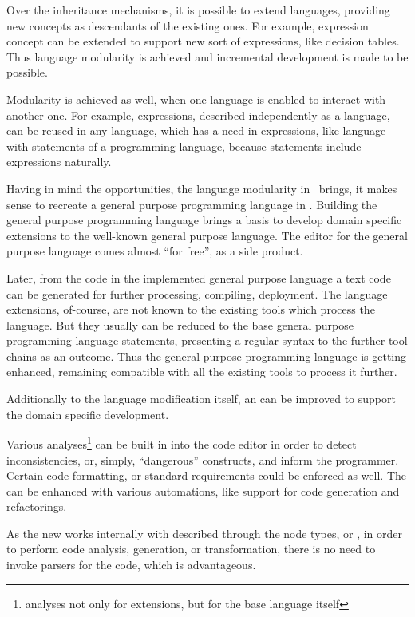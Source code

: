 Over the inheritance mechanisms, it is possible to extend languages, providing new concepts as descendants of 
the existing ones. For example, expression concept can be extended to support new sort of expressions, like decision tables.
Thus language modularity is achieved and incremental development is made to be possible.

Modularity is achieved as well, when one language is enabled to interact with another one. For example, expressions,
described independently as a language, can be reused in any language, which has a need in expressions, like language with
statements of a programming language, because statements include expressions naturally.

Having in mind the opportunities, the language modularity in \jbmps\ brings, it makes sense to recreate a general 
purpose programming language in \jbmps. Building the general purpose programming language brings a basis to develop 
domain specific extensions to the well-known general purpose language. The editor for the general purpose language comes 
almost ``for free'', as a side product. 

Later, from the code in the implemented general purpose language a text code can be generated for further processing, 
compiling, deployment. The language extensions, of-course, are not known to the existing tools which process the language.
But they usually can be reduced to the base general purpose programming language statements, presenting a regular 
syntax to the further tool chains as an outcome. Thus the general purpose programming language is getting enhanced,
remaining compatible with all the existing tools to process it further.

Additionally to the language modification itself, an  can be improved to support the domain specific 
development. 

Various analyses\footnote{analyses not only for extensions, but for the base language itself} 
can be built in into the code editor in order to detect inconsistencies, or, simply, ``dangerous'' constructs, 
and inform the programmer. Certain code formatting, or standard requirements could be enforced as well. 
The  can be enhanced with various automations, like support for code generation and refactorings. 

As the new  works internally with  described through the node types, or , in order to perform code
analysis, generation, or transformation, there is no need to invoke parsers for the code, which is advantageous.

